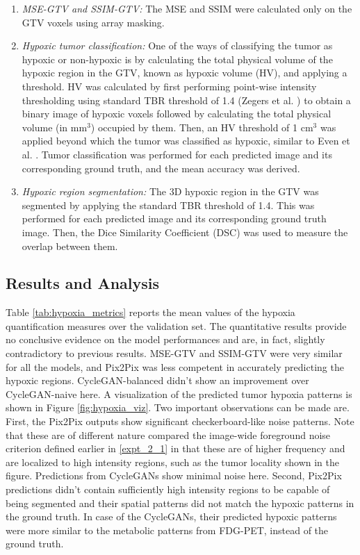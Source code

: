 \begin{enumerate}
    
    \item \textit{MSE-GTV and SSIM-GTV:} The MSE and SSIM were calculated only on the GTV voxels using array masking.
    
    \item \textit{Hypoxic tumor classification:} One of the ways of classifying the tumor as hypoxic or non-hypoxic is by calculating the total physical volume of the hypoxic region in the GTV, known as hypoxic volume (HV), and applying a threshold. HV was calculated by first performing point-wise intensity thresholding using standard TBR threshold of 1.4 (Zegers et al. \cite{zegers2013hypoxia}) to obtain a binary image of hypoxic voxels followed by calculating the total physical volume (in mm$^3$) occupied by them. Then, an HV threshold of 1 cm$^3$ was applied beyond which the tumor was classified as hypoxic, similar to Even et al. \cite{even2017predicting}. Tumor classification was performed for each predicted image and its corresponding ground truth, and the mean accuracy was derived.
    
    \item \textit{Hypoxic region segmentation:} The 3D hypoxic region in the GTV was segmented by applying the standard TBR threshold of 1.4. This was performed for each predicted image and its corresponding ground truth image. Then, the Dice Similarity Coefficient (DSC) was used to measure the overlap between them. 

\end{enumerate}


\subsection{Results and Analysis}
Table \ref{tab:hypoxia_metrics} reports the mean values of the hypoxia quantification measures over the validation set. The quantitative results provide no conclusive evidence on the model performances and are, in fact, slightly contradictory to previous results. MSE-GTV and SSIM-GTV were very similar for all the models, and Pix2Pix was less competent in accurately predicting the hypoxic regions. CycleGAN-balanced didn't show an improvement over CycleGAN-naive here. A visualization of the predicted tumor hypoxia patterns is shown in Figure \ref{fig:hypoxia_viz}. Two important observations can be made are. First, the Pix2Pix outputs show significant checkerboard-like noise patterns. Note that these are of different nature compared the image-wide foreground noise criterion defined earlier in \ref{expt_2_1} in that these are of higher frequency and are localized to high intensity regions, such as the tumor locality shown in the figure. Predictions from CycleGANs show minimal noise here. Second, Pix2Pix predictions didn't contain sufficiently high intensity regions to be capable of being segmented and their spatial patterns did not match the hypoxic patterns in the ground truth. In case of the CycleGANs, their predicted hypoxic patterns were more similar to the metabolic patterns from FDG-PET, instead of the ground truth.

